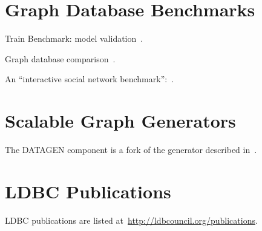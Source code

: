 \section{Graph Database Benchmarks}

Train Benchmark: model validation~\cite{TrainBenchmarkSOSYM}.

Graph database comparison~\cite{lissandrini17}.

An ``interactive social network benchmark'':~\cite{DBLP:conf/cidr/BarahmandG13}.

\section{Scalable Graph Generators}

The DATAGEN component is a fork of the generator described in~\cite{DBLP:conf/tpctc/PhamBE12}.


\section{LDBC Publications}

LDBC publications are listed at~\url{http://ldbcouncil.org/publications}.